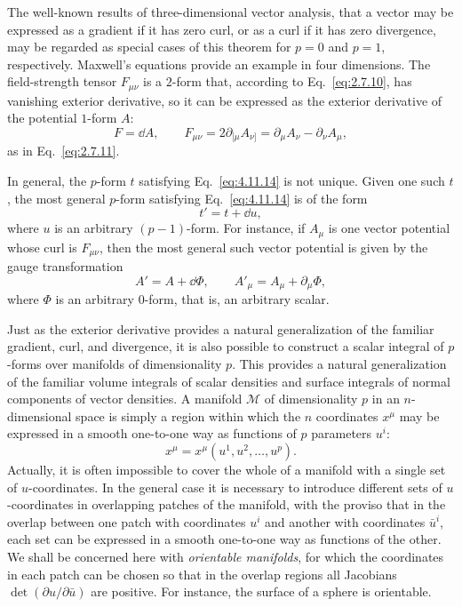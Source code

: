 The well-known results of three-dimensional vector analysis, that a vector
may be expressed as a gradient if it has zero curl, or as a curl if it has
zero divergence, may be regarded as special cases of this theorem for
\(p=0\) and \(p=1\), respectively. Maxwell's equations provide an example
in four dimensions. The field-strength tensor \(F_{\mu\nu}\) is a
\(2\)-form that, according to Eq.~\eqref{eq:2.7.10}, has vanishing exterior
derivative, so it can be expressed as the exterior derivative of the
potential \(1\)-form \(A\):
\[
  F=\dd A,
  \qquad
  F_{\mu\nu}
  =
  2\partial_{[\mu}A_{\nu]}
  =
  \partial_\mu A_\nu-\partial_\nu A_\mu,
\]
as in Eq.~\eqref{eq:2.7.11}.

In general, the \(p\)-form \(t\) satisfying Eq.~\eqref{eq:4.11.14} is not
unique. Given one such \(t\), the most general \(p\)-form satisfying
Eq.~\eqref{eq:4.11.14} is of the form
\begin{equation}
  t'=t+\dd u,
  \tag{4.11.16}\label{eq:4.11.16}
\end{equation}
where \(u\) is an arbitrary \((p-1)\)-form. For instance, if \(A_\mu\) is
one vector potential whose curl is \(F_{\mu\nu}\), then the most general
such vector potential is given by the gauge transformation
\[
  A'=A+\dd\Phi,
  \qquad
  A'_\mu=A_\mu+\partial_\mu\Phi,
\]
where \(\Phi\) is an arbitrary \(0\)-form, that is, an arbitrary scalar.

Just as the exterior derivative provides a natural generalization of the
familiar gradient, curl, and divergence, it is also possible to construct a
scalar integral of \(p\)-forms over manifolds of dimensionality \(p\). This
provides a natural generalization of the familiar volume integrals of scalar
densities and surface integrals of normal components of vector densities. A
manifold \(\mathcal M\) of dimensionality \(p\) in an \(n\)-dimensional
space is simply a region within which the \(n\) coordinates \(x^\mu\) may be
expressed in a smooth one-to-one way as functions of \(p\) parameters
\(u^i\):
\begin{equation}
  x^\mu=x^\mu(u^1,u^2,\ldots,u^p).
  \tag{4.11.17}\label{eq:4.11.17}
\end{equation}
Actually, it is often impossible to cover the whole of a manifold with a
single set of \(u\)-coordinates. In the general case it is necessary to
introduce different sets of \(u\)-coordinates in overlapping patches of the
manifold, with the proviso that in the overlap between one patch with
coordinates \(u^i\) and another with coordinates \(\bar u^i\), each set can
be expressed in a smooth one-to-one way as functions of the other. We shall
be concerned here with \textit{orientable manifolds}, for which the
coordinates in each patch can be chosen so that in the overlap regions all
Jacobians \(\det(\partial u/\partial\bar u)\) are positive. For instance,
the surface of a sphere is orientable.

